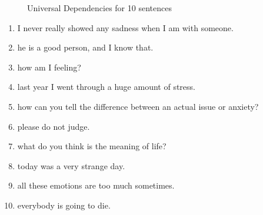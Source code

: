 \documentclass[12pt, a4paper]{article}
\begin{document}
\begin{figure}[H]
	\caption{Universal Dependencies for 10 sentences}
	\label{parsing_examples}
\end{figure}

\begin{enumerate}
	\item I never really showed any sadness when I am with someone.
	\item he is a good person, and I know that.
	\item how am I feeling?
	\item last year I went through a huge amount of stress.
	\item how can you tell the difference between an actual issue or anxiety?
	\item please do not judge.
	\item what do you think is the meaning of life?
	\item today was a very strange day.
	\item all these emotions are too much sometimes. 
	\item everybody is going to die.
\end{enumerate}
\end{document}
